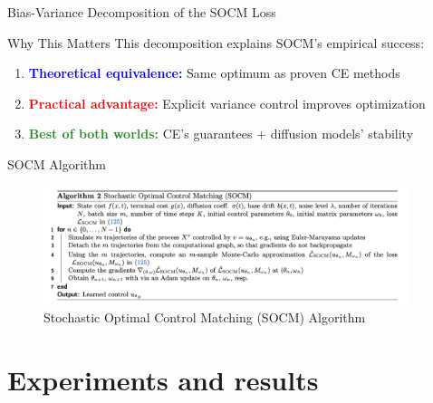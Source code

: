 \documentclass[aspectratio=169,xcolor=dvipsnames]{beamer}
\begin{document}
\begin{frame}[allowframebreaks]{Bias-Variance Decomposition of the SOCM Loss}
    \vspace{0.8cm}
    
    \begin{alertblock}{Why This Matters}
        This decomposition explains SOCM's empirical success:
        \begin{enumerate}
            \item \textcolor{blue}{\textbf{Theoretical equivalence:}} Same optimum as proven CE methods
            \item \textcolor{red}{\textbf{Practical advantage:}} Explicit variance control improves optimization
            \item \textcolor{ForestGreen}{\textbf{Best of both worlds:}} CE's guarantees + diffusion models' stability
        \end{enumerate}
    \end{alertblock}
    
\end{frame}


\begin{frame}{SOCM Algorithm}
    \begin{figure}
        \centering
        \includegraphics[width=0.95\textwidth]{figures/SOCM_algo.png}
        \caption{Stochastic Optimal Control Matching (SOCM) Algorithm}
    \end{figure}
\end{frame}



\section{Experiments and results}
\end{document}
